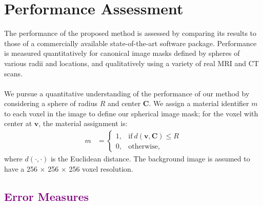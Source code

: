 \section{Performance Assessment}
%

The performance of the proposed method is assessed by comparing its results to those of a commercially available state-of-the-art software package. Performance is measured quantitatively for canonical image masks defined by spheres of various radii and locations, and qualitatively using a variety of real MRI and CT scans. \\ \\
%
We pursue a quantitative understanding of the performance of our method by considering a sphere of radius $R$ and center $\bm{C}$.  We assign a material identifier $m$ to each voxel in the image to define our spherical image mask; for the voxel with center at $\bm{v}$, the material assignment is:
\begin{align} 
	m &=  \begin{cases}
		1, & \text{if}\ d \left(\bm{v},\bm{C}\right) \le R \\
		0, & \text{otherwise},
	\end{cases}
\end{align}
where $d(\cdot,\cdot)$ is the Euclidean distance. The background image is assumed to have a 256 $\times$ 256 $\times$ 256 voxel resolution.
\subsection{\textcolor{purple}{Error Measures}}
\label{Error Measures}

